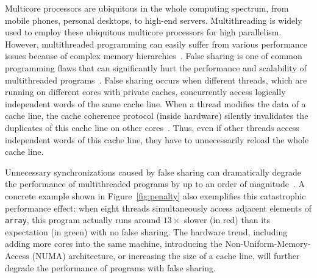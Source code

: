 Multicore processors are ubiquitous in the whole computing spectrum, from mobile phones, personal desktops, to high-end servers. Multithreading is widely used to employ these ubiquitous multicore processors for high parallelism. However, multithreaded programming can easily suffer from various performance issues because of complex memory hierarchies~\cite{ibs-sc,ibs-sc2,Dramon}. False sharing is one of common programming flaws that can significantly hurt the performance and scalability of multithreaded programs~\cite{falseshare:effect}. False sharing occurs when different threads, which are running on different cores with private caches, concurrently access logically independent words of the same cache line. When a thread modifies the data of a cache line, the cache coherence protocol (inside hardware) silently invalidates the duplicates of this cache line on other cores~\cite{MESI}. Thus, even if other threads access independent words of this cache line, they have to unnecessarily reload the whole cache line. 

Unnecessary synchronizations caused by false sharing can dramatically degrade the performance of multithreaded programs by up to an order of magnitude~\cite{falseshare:effect}. A concrete example shown in Figure~\ref{fig:penalty} also exemplifies this catastrophic performance effect: when eight threads simultaneously access adjacent elements of {\tt array}, this program actually runs around $13\times$ slower (in red) than its expectation (in green) with no false sharing. The hardware trend, including adding more cores into the same machine, introducing the Non-Uniform-Memory-Access (NUMA) architecture, or increasing the size of a cache line, will further degrade the performance of programs with false sharing.

